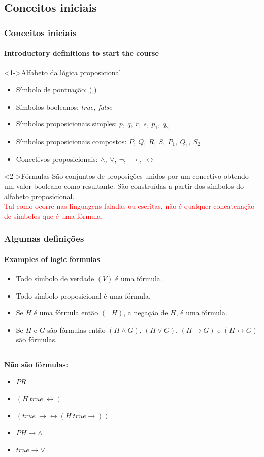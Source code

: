 \documentclass[10pt, headsepline, captions=tableabove, xcolor=table]{beamer}
\begin{document}
\subsection{Conceitos iniciais}
%
\begin{frame}[t]
    \frametitle{Conceitos iniciais}
    \framesubtitle{Introductory definitions to start the course}
    \begin{block}<1->{Alfabeto da lógica proposicional}
        \begin{itemize}
            \item Símbolo de pontuação: (,)
            \item Símbolos booleanos: \textit{true, false}
            \item Símbolos proposicionais simples: $p,~q,~r,~s,~p_1,~q_2$
            \item Símbolos proposicionais compostos: $P,~Q,~R,~S,~P_1,~Q_1,~S_2$
            \item Conectivos proposicionais: $\land,~\lor,~\lnot,~\rightarrow, ~\leftrightarrow$
        \end{itemize}
    \end{block}
    \begin{block}<2->{Fórmulas}
        \quad São conjuntos de proposições unidos por um conectivo obtendo um valor booleano como resultante. São construídas a partir dos símbolos do alfabeto proposicional.\\
        \quad \textcolor{red}{Tal como ocorre nas linguagens faladas ou escritas, não é qualquer concatenação de símbolos que é uma fórmula.}
    \end{block}
\end{frame}
%
\begin{frame}[t]
    \pagecolor{black}
    \frametitle{Algumas definições}
    \framesubtitle{Examples of logic formulas}
        \begin{itemize}
            \item Todo símbolo de verdade $(V)$ é uma fórmula.
            \item Todo símbolo proposicional é uma fórmula.
            \item Se $H$ é uma fórmula então $(\lnot H)$, a negação de $H$, é uma fórmula.
            \item Se $H$ e $G$ são fórmulas então $(H \land G)$, $(H \lor G)$, $(H \rightarrow G)$ e $(H \leftrightarrow G)$ são fórmulas. 
        \end{itemize}
        {\color{blue} \rule{\linewidth}{1mm}}
        \pause
        \textbf{Não são fórmulas:}\\
        \begin{itemize}
            \item $PR$
            \item $(H~true~\leftrightarrow)$
            \item $(true~\rightarrow \leftrightarrow (H~true \rightarrow))$
            \item $PH \rightarrow \land$
            \item $true \rightarrow \lor$
        \end{itemize}
\end{frame}
%
\end{document}
